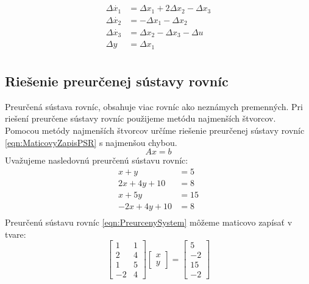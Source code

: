 \documentclass[../main.tex]{subfiles}
\begin{document}
\begin{equation}
		\begin{aligned}
		\Delta{\dot{x_1}} &= \Delta{x_1} + 2\Delta{x_2} - \Delta{x_3}			\\
		\Delta{\dot{x_2}} &= -\Delta{x_1} - \Delta{x_2} \\
		\Delta{\dot{x_3}} &= \Delta{x_2} - \Delta{x_3} - \Delta{u}		\\
		\Delta{y} &= \Delta{x_1}			\\
		\end{aligned}
		\label{eqn:matz_rovniceLinearnySystem}
\end{equation}
	
\subsection{Riešenie preurčenej sústavy rovníc}
Preurčená sústava rovníc, obsahuje viac rovníc ako neznámych premenných. Pri riešení preurčene sústavy rovníc použijeme metódu najmenších štvorcov. Pomocou metódy najmenších štvorcov určíme riešenie preurčenej sústavy rovníc \ref{eqn:MaticovyZapisPSR} s najmenšou chybou.
\begin{equation}
    Ax = b 
	\label{eqn:MaticovyZapisPSR}
\end{equation}
Uvažujeme nasledovnú preurčenú sústavu rovníc:
\begin{equation}
	\begin{aligned}
	 x+y  & = 5 \\
	 2x+4y+10 & = 8 \\
	 x+5y & = 15 \\
	 -2x+4y+10 & = 8 \\
	\end{aligned}
	\label{eqn:PreurcenySystem}
\end{equation}
Preurčenú sústavu rovníc \ref{eqn:PreurcenySystem} môžeme maticovo zapísať v tvare:
\begin{equation}
    \begin{bmatrix} 1 & 1\\ 2 & 4 \\1 &5 \\-2& 4\end{bmatrix}\begin{bmatrix}x \\y \end{bmatrix} = \begin{bmatrix} 5 \\-2\\15\\-2 \end{bmatrix}
    \label{eqn:MaticovyZapisPiklad}
\end{equation}
\end{document}

